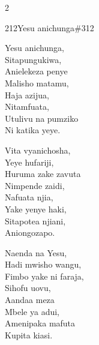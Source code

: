\begin{multicols}{2}
\begin{hymn}{212}{Yesu anichunga}{\#312}
\begin{stanza}
Yesu anichunga,\\
Sitapungukiwa,\\
Anielekeza penye\\
Malisho matamu,\\
Haja azijua,\\
Nitamfuata,\\
Utulivu na pumziko\\
Ni katika yeye.
\end{stanza}
\begin{stanza}
Vita vyanichosha,\\
Yeye hufariji,\\
Huruma zake zavuta\\
Nimpende zaidi,\\
Nafuata njia,\\
Yake yenye haki,\\
Sitapotea njiani,\\
Aniongozapo.
\end{stanza}
\begin{stanza}
Naenda na Yesu,\\
Hadi mwisho wangu,\\
Fimbo yake ni faraja,\\
Sihofu uovu,\\
Aandaa meza\\
Mbele ya adui,\\
Amenipaka mafuta\\
Kupita kiasi.
\end{stanza}
\end{hymn}


\end{multicols}
